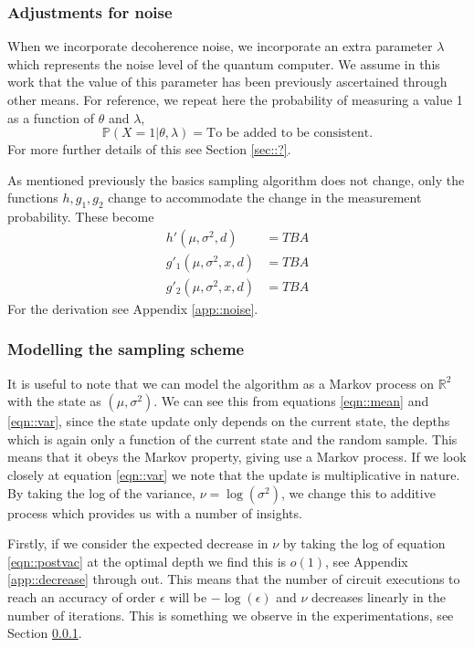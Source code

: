 \subsubsection{Adjustments for noise}
When we incorporate decoherence noise, we incorporate an extra parameter $\lambda$ which represents the noise level of the quantum computer. We assume in this work that the value of this parameter has been previously ascertained through other means. For reference, we repeat here the probability of measuring a value 1 as a function of $\theta$ and $\lambda$,
$$\mathbb{P}(X=1| \theta, \lambda)=\text{To be added to be consistent.}$$
For more further details of this see Section \ref{sec::?}.

As mentioned previously the basics sampling algorithm does not change, only the functions $h, g_1, g_2$ change to accommodate the change in the measurement probability. These become
\begin{align}
	h'(\mu,\sigma^2,d) &= TBA \label{eqn::npostvac}\\
	g'_1(\mu,\sigma^2,x,d) &= TBA \label{eqn::nmean}\\
	g'_2(\mu,\sigma^2,x,d) &= TBA \label{eqn::nvar}
\end{align}
For the derivation see Appendix \ref{app::noise}.


\subsubsection{Modelling the sampling scheme}\label{sec::model}

It is useful to note that we can model the algorithm as a Markov process on $\mathbb{R}^2$ with the state as $(\mu,\sigma^2)$. We can see this from equations \ref{eqn::mean} and \ref{eqn::var}, since the state update only depends on the current state, the depths which is again only a function of the current state and the random sample. This means that it obeys the Markov property, giving use a Markov process. If we look closely at equation \ref{eqn::var} we note that the update is multiplicative in nature. By taking the log of the variance, $\nu=\log(\sigma^2)$, we change this to additive process which provides us with a number of insights.

Firstly, if we consider the expected decrease in $\nu$ by taking the log of equation \ref{eqn::postvac} at the optimal depth we find this is $o(1)$, see Appendix \ref{app::decrease} through out. This means that the number of circuit executions to reach an accuracy of order $\epsilon$ will be $-\log(\epsilon)$ and $\nu$ decreases linearly in the number of iterations. This is something we observe in the experimentations, see Section \ref{}.

